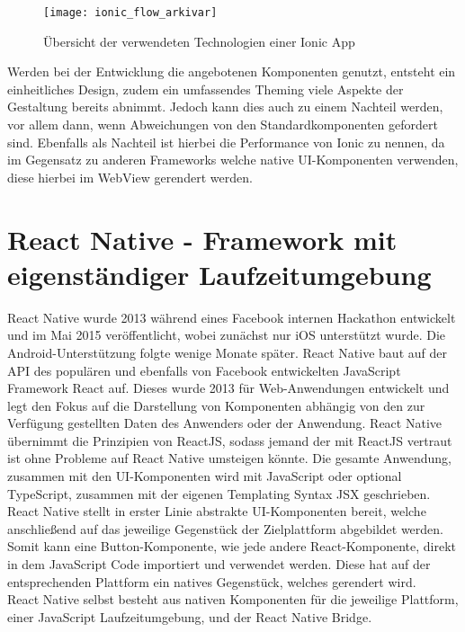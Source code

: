 \begin{figure}[h]
	\texttt{[image: ionic\_flow\_arkivar]}
	\centering
	\caption[Übersicht der verwendeten Technologien einer Ionic App]{Übersicht der verwendeten Technologien einer Ionic App\cite{ionicForum_diagramm}}
\end{figure}

Werden bei der Entwicklung die angebotenen Komponenten genutzt, entsteht ein einheitliches Design, zudem ein umfassendes Theming viele Aspekte der Gestaltung bereits abnimmt. Jedoch kann dies auch zu einem Nachteil werden, vor allem dann, wenn Abweichungen von den Standardkomponenten gefordert sind. Ebenfalls als Nachteil ist hierbei die Performance von Ionic zu nennen, da im Gegensatz zu anderen Frameworks welche native \ac{UI}-Komponenten verwenden, diese hierbei im WebView gerendert werden\cite{altexsoft_comparison}.

\newpage
\section{React Native - Framework mit eigenständiger Laufzeitumgebung}
\label{react}
React Native wurde 2013 während eines Facebook internen Hackathon entwickelt und im Mai 2015 veröffentlicht, wobei zunächst nur iOS unterstützt wurde. Die Android-Unterstützung folgte wenige Monate später. React Native baut auf der \ac{API} des populären und ebenfalls von Facebook entwickelten JavaScript Framework React auf. Dieses wurde 2013 für Web-Anwendungen entwickelt und legt den Fokus auf die Darstellung von Komponenten abhängig von den zur Verfügung gestellten Daten des Anwenders oder der Anwendung. React Native übernimmt die Prinzipien von ReactJS, sodass jemand der mit ReactJS vertraut ist ohne Probleme auf React Native umsteigen könnte. Die gesamte Anwendung, zusammen mit den \ac{UI}-Komponenten wird mit JavaScript oder optional TypeScript, zusammen mit der eigenen Templating Syntax JSX geschrieben. React Native stellt in erster Linie abstrakte \ac{UI}-Komponenten bereit, welche anschließend auf das jeweilige Gegenstück der Zielplattform abgebildet werden. Somit kann eine Button-Komponente, wie jede andere React-Komponente, direkt in dem JavaScript Code importiert und verwendet werden. Diese hat auf der entsprechenden Plattform ein natives Gegenstück, welches gerendert wird\cite{rieger_evaluation}\cite{hansen_performance_overhead_cross_platform}\cite{droids_react_intro}.\\

React Native selbst besteht aus nativen Komponenten für die jeweilige Plattform, einer JavaScript Laufzeitumgebung, und der React Native Bridge\cite{react_intro_book}.

